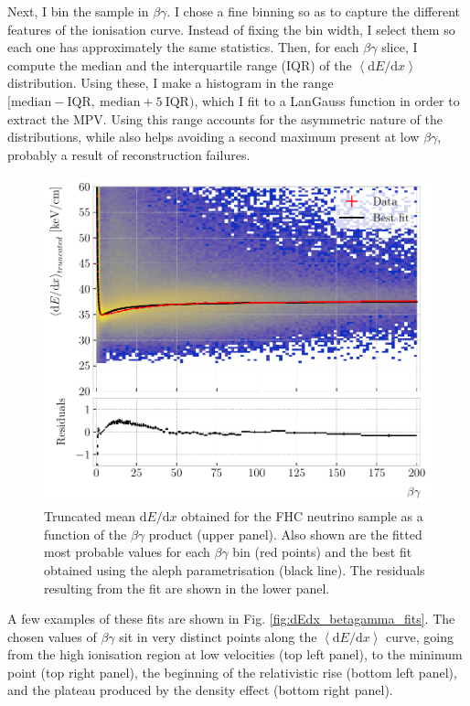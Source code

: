 Next, I bin the sample in $\beta\gamma$. I chose a fine binning so as to capture the different features of the ionisation curve. Instead of fixing the bin width, I select them so each one has approximately the same statistics. Then, for each $\beta\gamma$ slice, I compute the median and the interquartile range (IQR) of the $\left<\mathrm{d}E/\mathrm{d}x\right>$ distribution. Using these, I make a histogram in the range $[\mathrm{median}-\mathrm{IQR},~ \mathrm{median}+5~\mathrm{IQR})$, which I fit to a LanGauss function in order to extract the MPV. Using this range accounts for the asymmetric nature of the distributions, while also helps avoiding a second maximum present at low $\beta\gamma$, probably a result of reconstruction failures.

\begin{figure}[t]
	\centering
	\includegraphics[width=.85\linewidth]{Images/GArSoft_PID/dEdx/dEdx_aleph_data_with_fit.pdf}
	\caption[Truncated mean $\mathrm{d}E/\mathrm{d}x$ as a function of the $\beta\gamma$ product, together with the best fit obtained using the \gls{aleph} parametrisation.]{Truncated mean $\mathrm{d}E/\mathrm{d}x$ obtained for the FHC neutrino sample as a function of the $\beta\gamma$ product (upper panel). Also shown are the fitted most probable values for each $\beta\gamma$ bin (red points) and the best fit obtained using the \gls{aleph} parametrisation (black line). The residuals resulting from the fit are shown in the lower panel.}
	\label{fig:dEdx_betagamma_aleph}
\end{figure}

A few examples of these fits are shown in Fig. \ref{fig:dEdx_betagamma_fits}. The chosen values of $\beta\gamma$ sit in very distinct points along the $\left<\mathrm{d}E/\mathrm{d}x\right>$ curve, going from the high ionisation region at low velocities (top left panel), to the minimum point (top right panel), the beginning of the relativistic rise (bottom left panel), and the plateau produced by the density effect (bottom right panel).


